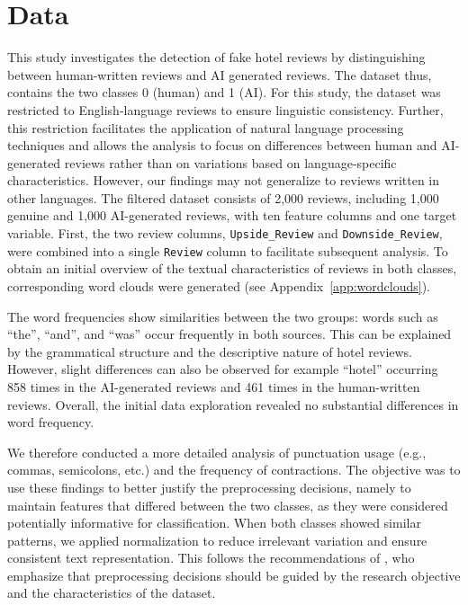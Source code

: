 \documentclass[pmlr]{jmlr}%
\begin{document}
\section{Data}
\label{sec:data}
This study investigates the detection of fake hotel reviews by distinguishing between human-written reviews and AI generated reviews. 
The dataset thus, contains the two classes 0 (human) and 1 (AI). For this study, the dataset was restricted to English-language reviews to ensure linguistic consistency. 
Further, this restriction facilitates the application of natural language processing techniques and allows the analysis to focus on differences 
between human and AI-generated reviews rather than on variations based on language-specific characteristics. 
However, our findings may not generalize to reviews written in other languages.
\newline
The filtered dataset consists of 2,000 reviews, including 1,000 genuine and 1,000 AI-generated reviews, with ten feature columns and one target variable.
First, the two review columns, \texttt{Upside\_Review} and \texttt{Downside\_Review}, were combined into a single \texttt{Review} column to facilitate subsequent analysis.
To obtain an initial overview of the textual characteristics of reviews in both classes, corresponding word clouds were generated (see Appendix~\ref{app:wordclouds}).

The word frequencies show similarities between the two groups: words such as ``the'', ``and'', and ``was'' occur frequently in both sources. 
This can be explained by the grammatical structure and the descriptive nature of hotel reviews. 
However, slight differences can also be observed for example ``hotel'' occurring 858 times in the AI-generated reviews and 461 times in the human-written reviews. 
Overall, the initial data exploration revealed no substantial differences in word frequency. 

We therefore conducted a more detailed analysis of punctuation usage (e.g., commas, semicolons, etc.) and the frequency of contractions. 
The objective was to use these findings to better justify the preprocessing decisions, namely to maintain features that differed between the two classes, as they were considered potentially informative for classification. 
When both classes showed similar patterns, we applied normalization to reduce irrelevant variation and ensure consistent text representation. 
This follows the recommendations of \citet{Hickman2022}, who emphasize that preprocessing decisions should be guided by the research objective and the characteristics of the dataset.
\end{document}
